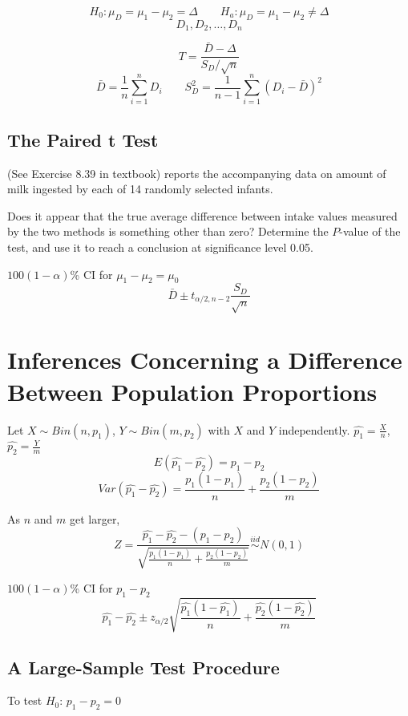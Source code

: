\[H_0:\mu_D=\mu_1-\mu_2=\Delta \qquad H_a:\mu_D=\mu_1-\mu_2 \neq\Delta\]
\[D_1,D_2,\dots,D_n\]

\[T=\frac{\bar{D}-\Delta}{S_D/\sqrt{n}}\]
\[\bar{D}=\frac{1}{n}\sum_{i=1}^n D_i \qquad  S_D^2=\frac{1}{n-1}\sum_{i=1}^n (D_i-\bar{D})^2\]

\subsection{The Paired t Test}

\begin{exmp}
(See Exercise 8.39 in textbook) reports the accompanying data on amount of milk ingested by each of 14 randomly selected infants.

Does it appear that the true average difference between intake values measured by the two methods is something other than zero? Determine the $P$-value of the test, and use it to reach a conclusion at significance level 0.05.


\end{exmp}

$100(1-\alpha)$\% CI for $\mu_1-\mu_2=\mu_0$
\[\bar{D} \pm t_{\alpha/2,n-2}\frac{S_D}{\sqrt{n}}\]

\section{Inferences Concerning a Difference Between Population Proportions}

\begin{prop}
Let $X\sim Bin(n,p_1)$, $Y\sim Bin(m,p_2)$ with $X$ and $Y$ independently. $\hat{p_1}=\frac{X}{n}$,$\hat{p_2}=\frac{Y}{m}$
\[E(\hat{p_1}-\hat{p_2})=p_1-p_2\]
\[Var(\hat{p_1}-\hat{p_2})=\frac{p_1(1-p_1)}{n}+\frac{p_2(1-p_2)}{m}\]
\end{prop}

As $n$ and $m$ get larger,
\[Z=\frac{\hat{p_1}-\hat{p_2}-(p_1-p_2)}{\sqrt{\frac{p_1(1-p_1)}{n}+\frac{p_2(1-p_2)}{m}}} \overset{iid}{\sim} N(0,1)\]

$100(1-\alpha)$\% CI for $p_1-p_2$
\[\hat{p_1}-\hat{p_2} \pm z_{\alpha/2}\sqrt{\frac{\hat{p_1}(1-\hat{p_1})}{n}+\frac{\hat{p_2}(1-\hat{p_2})}{m}}\]

\subsection{A Large-Sample Test Procedure}

To test $H_0$: $p_1-p_2=0$

